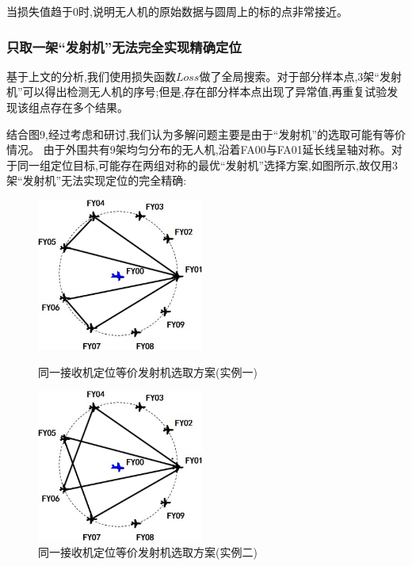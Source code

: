 \documentclass[withoutpreface,bwprint]{cumcmthesis} %
\begin{document}
						当损失值趋于0时,说明无人机的原始数据与圆周上的标的点非常接近。
					
					\subsubsection{只取一架“发射机”无法完全实现精确定位}
					
					基于上文的分析,我们使用损失函数$Loss$做了全局搜索。对于部分样本点,3架“发射机”可以得出检测无人机的序号;但是,存在部分样本点出现了异常值,再重复试验发现该组点存在多个结果。
					
						结合图9,经过考虑和研讨,我们认为多解问题主要是由于“发射机”的选取可能有等价情况。
					由于外围共有9架均匀分布的无人机,沿着FA00与FA01延长线呈轴对称。对于同一组定位目标,可能存在两组对称的最优“发射机”选择方案,如图所示,故仅用3架“发射机”无法实现定位的完全精确:
					
					
					\begin{figure}[!htpb]
						\begin{minipage}{0.48\linewidth}
						\centering
						\includegraphics[height=5cm]{./figures/6-7.png}
						\caption{同一接收机定位等价发射机选取方案(实例一)}\label{fig:19}
						\end{minipage}
						\begin{minipage}{0.48\linewidth}
						\centering
						\includegraphics[height=5cm]{./figures/6-8.png}
						\caption{同一接收机定位等价发射机选取方案(实例二)}\label{fig:20}
						\end{minipage}
					\end{figure}
					
\end{document}
